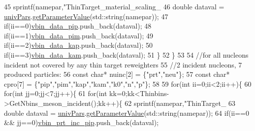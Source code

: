 \begin{DoxyCode}
45         sprintf(namepar,\textcolor{stringliteral}{"ThinTarget\_material\_scaling\_%
46         \textcolor{keywordtype}{double} dataval = \hyperlink{class_neutrino_flux_reweight_1_1_thin_targetnucleon_a_reweighter_a56d10ce15819c77e9d4a6538f403b71e}{univPars}.\hyperlink{class_neutrino_flux_reweight_1_1_parameter_table_acb7dc8335b65b116f6092f2fa57ca5ed}{getParameterValue}(std::string(namepar));
47         \textcolor{keywordflow}{if}(ii==0)\hyperlink{class_neutrino_flux_reweight_1_1_thin_targetnucleon_a_reweighter_ae7012b962ce5fc1297fe56722661532a}{vbin\_data\_pip}.push\_back(dataval);
48         \textcolor{keywordflow}{if}(ii==1)\hyperlink{class_neutrino_flux_reweight_1_1_thin_targetnucleon_a_reweighter_ae0b6c63ce05db44c64d8b272ce3cbaed}{vbin\_data\_pim}.push\_back(dataval);
49         \textcolor{keywordflow}{if}(ii==2)\hyperlink{class_neutrino_flux_reweight_1_1_thin_targetnucleon_a_reweighter_acfadbda1695d49d43efe9e5a5395317b}{vbin\_data\_kap}.push\_back(dataval);
50         \textcolor{keywordflow}{if}(ii==3)\hyperlink{class_neutrino_flux_reweight_1_1_thin_targetnucleon_a_reweighter_ae434ebe9822621ab7e5250b4057a883d}{vbin\_data\_kam}.push\_back(dataval);
51       \}
52     \}
53 
54     \textcolor{comment}{//for all nucleons incident not covered by any thin target reweighters    }
55     \textcolor{comment}{//2 incident nucleons, 7 produced particles:}
56     \textcolor{keyword}{const} \textcolor{keywordtype}{char}* nuinc[2] = \{\textcolor{stringliteral}{"prt"},\textcolor{stringliteral}{"neu"}\};
57     \textcolor{keyword}{const} \textcolor{keywordtype}{char}* cpro[7] = \{\textcolor{stringliteral}{"pip"},\textcolor{stringliteral}{"pim"},\textcolor{stringliteral}{"kap"},\textcolor{stringliteral}{"kam"},\textcolor{stringliteral}{"k0"},\textcolor{stringliteral}{"n"},\textcolor{stringliteral}{"p"}\};
58     
59     \textcolor{keywordflow}{for}(\textcolor{keywordtype}{int} ii=0;ii<2;ii++)\{
60       \textcolor{keywordflow}{for}(\textcolor{keywordtype}{int} jj=0;jj<7;jj++)\{
61         \textcolor{keywordflow}{for}(\textcolor{keywordtype}{int} kk=0;kk<Thinbins->GetNbins\_meson\_incident();kk++)\{
62           sprintf(namepar,\textcolor{stringliteral}{"ThinTarget\_%
63           \textcolor{keywordtype}{double} dataval = \hyperlink{class_neutrino_flux_reweight_1_1_thin_targetnucleon_a_reweighter_a56d10ce15819c77e9d4a6538f403b71e}{univPars}.\hyperlink{class_neutrino_flux_reweight_1_1_parameter_table_acb7dc8335b65b116f6092f2fa57ca5ed}{getParameterValue}(std::string(namepar));
64           \textcolor{keywordflow}{if}(ii==0 && jj==0)\hyperlink{class_neutrino_flux_reweight_1_1_thin_targetnucleon_a_reweighter_a62d37535ba63cd757dcf40763a66d459}{vbin\_prt\_inc\_pip}.push\_back(dataval);
}}
\end{DoxyCode}
